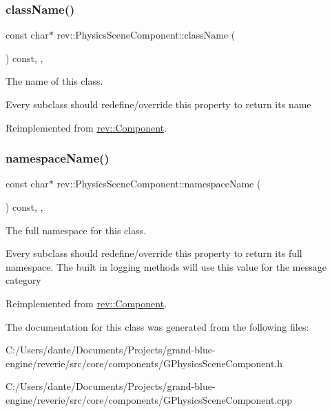 \subsubsection{\texorpdfstring{className()}{className()}}
{\footnotesize\ttfamily const char$\ast$ rev\+::\+Physics\+Scene\+Component\+::class\+Name (\begin{DoxyParamCaption}{ }\end{DoxyParamCaption}) const\hspace{0.3cm}{\ttfamily [inline]}, {\ttfamily [override]}, {\ttfamily [virtual]}}



The name of this class. 

Every subclass should redefine/override this property to return its name 

Reimplemented from \mbox{\hyperlink{classrev_1_1_component_a07619152d5acafe7a536df3a6a476349}{rev\+::\+Component}}.

\mbox{\label{classrev_1_1_physics_scene_component_addd583a06c948a96f86d90937a3c4c8d}} 
\subsubsection{\texorpdfstring{namespaceName()}{namespaceName()}}
{\footnotesize\ttfamily const char$\ast$ rev\+::\+Physics\+Scene\+Component\+::namespace\+Name (\begin{DoxyParamCaption}{ }\end{DoxyParamCaption}) const\hspace{0.3cm}{\ttfamily [inline]}, {\ttfamily [override]}, {\ttfamily [virtual]}}



The full namespace for this class. 

Every subclass should redefine/override this property to return its full namespace. The built in logging methods will use this value for the message category 

Reimplemented from \mbox{\hyperlink{classrev_1_1_component_ae2827b14c278588b95e01c4743fae674}{rev\+::\+Component}}.



The documentation for this class was generated from the following files\+:\begin{DoxyCompactItemize}
\item 
C\+:/\+Users/dante/\+Documents/\+Projects/grand-\/blue-\/engine/reverie/src/core/components/G\+Physics\+Scene\+Component.\+h\item 
C\+:/\+Users/dante/\+Documents/\+Projects/grand-\/blue-\/engine/reverie/src/core/components/G\+Physics\+Scene\+Component.\+cpp\end{DoxyCompactItemize}
